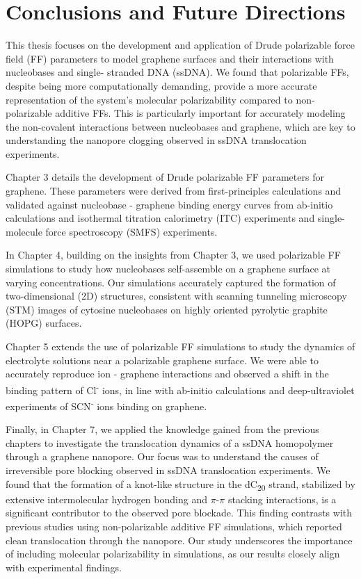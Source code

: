 \chapter[Conclusions and Future Directions]{Conclusions and Future Directions}
\justifying
This thesis focuses on the development and application of Drude polarizable force field (FF) parameters to model graphene surfaces and their interactions with nucleobases and single- stranded DNA (ssDNA). We found that polarizable FFs, despite being more computationally demanding, provide a more accurate representation of the system's molecular polarizability compared to non-polarizable additive FFs. This is particularly important for accurately modeling the non-covalent interactions between nucleobases and graphene, which are key to understanding the nanopore clogging observed in ssDNA translocation experiments.

Chapter 3 details the development of Drude polarizable FF parameters for graphene. These parameters were derived from first-principles calculations and validated against nucleobase - graphene binding energy curves from ab-initio calculations and isothermal titration calorimetry (ITC) experiments and single-molecule force spectroscopy (SMFS) experiments. 	

In Chapter 4, building on the insights from Chapter 3, we used polarizable FF simulations to study how nucleobases self-assemble on a graphene surface at varying concentrations. Our simulations accurately captured the formation of two-dimensional (2D) structures, consistent with scanning tunneling microscopy (STM) images of cytosine nucleobases on highly oriented pyrolytic graphite (HOPG) surfaces.

Chapter 5 extends the use of polarizable FF simulations to study the dynamics of electrolyte solutions near a polarizable graphene surface. We were able to accurately reproduce ion - graphene interactions and observed a shift in the binding pattern of Cl\textsuperscript{-} ions, in line with ab-initio calculations and deep-ultraviolet experiments of SCN\textsuperscript{-} ions binding on graphene.

Finally, in Chapter 7, we applied the knowledge gained from the previous chapters to investigate the translocation dynamics of a ssDNA homopolymer through a graphene nanopore. Our focus was to understand the causes of irreversible pore blocking observed in ssDNA translocation experiments. We found that the formation of a knot-like structure in the dC\textsubscript{20} strand, stabilized by extensive intermolecular hydrogen bonding and $\pi$-$\pi$ stacking interactions, is a significant contributor to the observed pore blockade. This finding contrasts with previous studies using non-polarizable additive FF simulations, which reported clean translocation through the nanopore. Our study underscores the importance of including molecular polarizability in simulations, as our results closely align with experimental findings.

